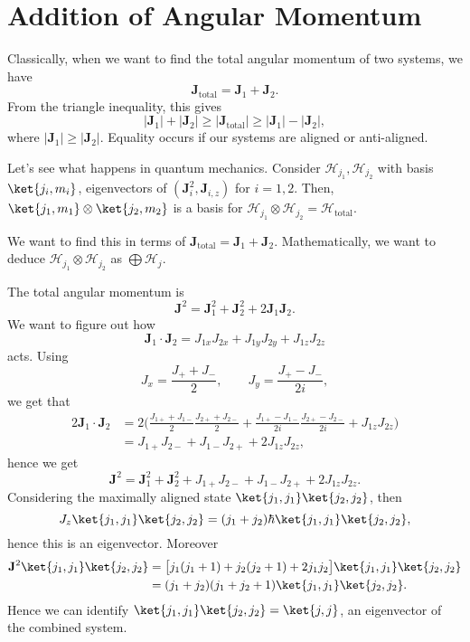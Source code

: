 \documentclass[12pt]{article}
\begin{document}
\newpage

\section{Addition of Angular Momentum}
\label{sec:add_mom}

Classically, when we want to find the total angular momentum of two systems, we have
\[
\mathbf{J}_{\mathrm{total}} = \mathbf{J}_1 + \mathbf{J}_2.
\]
From the triangle inequality, this gives
\[
|\mathbf{J}_1| + |\mathbf{J}_2| \geq |\mathbf{J}_{\mathrm{total}}| \geq |\mathbf{J}_1| - |\mathbf{J}_2|,
\]
where $|\mathbf{J}_1| \geq |\mathbf{J}_2|$. Equality occurs if our systems are aligned or anti-aligned.

Let's see what happens in quantum mechanics. Consider $\mathcal{H}_{j_1}, \mathcal{H}_{j_2}$ with basis $\ket{j_i, m_i}$, eigenvectors of $(\mathbf{J}_i^2, \mathbf{J}_{i,z})$ for $i = 1, 2$. Then, $\ket{j_1, m_1} \otimes \ket{j_2, m_2}$ is a basis for $\mathcal{H}_{j_1} \otimes \mathcal{H}_{j_2} = \mathcal{H}_{\mathrm{total}}$.

We want to find this in terms of $\mathbf{J}_{\mathrm{total}} = \mathbf{J}_1 + \mathbf{J}_2$. Mathematically, we want to deduce $\mathcal{H}_{j_1}\otimes \mathcal{H}_{j_2}$ as $\bigoplus \mathcal{H}_j$.

The total angular momentum is
\[
\mathbf{J}^2 = \mathbf{J}_1^2 + \mathbf{J}_2^2 + 2 \mathbf{J}_1 \mathbf{J}_2.
\]
We want to figure out how
\[
\mathbf{J}_1 \cdot \mathbf{J}_2 = J_{1x}J_{2x} + J_{1y}J_{2y} + J_{1z}J_{2z}
\]
acts. Using
\[
J_x = \frac{J_+ + J_-}{2}, \qquad J_y = \frac{J_+ - J_-}{2i},
\]
we get that
\begin{align*}
	2 \mathbf{J}_1 \cdot \mathbf{J}_2 &= 2 \biggl( \frac{J_{1+} + J_{1-}}{2} \frac{J_{2+} + J_{2-}}{2} + \frac{J_{1+}-J_{1-}}{2i} \frac{J_{2+}-J_{2-}}{2i} + J_{1z}J_{2z} \biggr) \\
					  &= J_{1+}J_{2-} + J_{1-}J_{2+} + 2J_{1z}J_{2z},
\end{align*}
hence we get
\[
\mathbf{J}^2 = \mathbf{J}_1^2 + \mathbf{J}_2^2 + J_{1+} J_{2-} + J_{1-} J_{2+} + 2 J_{1z} J_{2z}.
\]
Considering the maximally aligned state $\ket{j_1, j_1} \ket{j_2, j_2}$, then
\[
	J_z \ket{j_1, j_1} \ket{j_2, j_2} = (j_1 + j_2) \hbar \ket{j_1, j_1} \ket{j_2, j_2},
\]
hence this is an eigenvector. Moreover
\begin{align*}
	\mathbf{J}^2 \ket{j_1, j_1} \ket{j_2, j_2} &= \bigl[ j_1(j_1+1) + j_2(j_2+1) + 2j_1j_2\bigr] \ket{j_1,j_1}\ket{j_2,j_2} \\
						   &= (j_1+j_2)(j_1+j_2+1)\ket{j_1,j_1}\ket{j_2,j_2}.
\end{align*}
Hence we can identify $\ket{j_1,j_1}\ket{j_2,j_2} = \ket{j,j}$, an eigenvector of the combined system.
\end{document}
